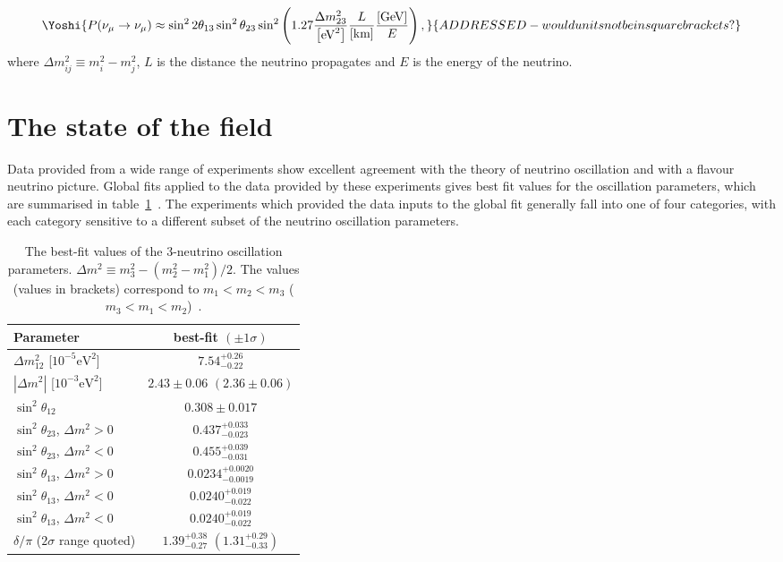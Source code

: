 \begin{equation}
  \Yoshi{P(\nu_\mu \rightarrow \nu_\mu) \approx \sin^{2}2\theta_{13}\sin^{2}\theta_{23}\sin^2\left(1.27\frac{\Delta m^{2}_{23}}{\left[\textrm{eV}^2\right]}\frac{L}{\left[\textrm{km}\right]}\frac{\left[\textrm{GeV}\right]}{E}\right),}{ADDRESSED - would units not be in square brackets?}
  \label{eq:ElectronNeutrinoAppearanceProbability}
\end{equation}
where $\Delta m^{2}_{ij} \equiv m^{2}_{i} - m^{2}_{j}$, $L$ is the distance the neutrino propagates and $E$ is the energy of the neutrino.

\section{The state of the field}
\label{sec:StateOfTheField}
Data provided from a wide range of experiments show excellent agreement with the theory of neutrino oscillation and with a flavour neutrino picture.  Global fits applied to the data provided by these experiments gives best fit values for the oscillation parameters, which are summarised in table~\ref{table:NeutrinoOscillationParameterValues}~\cite{Agashe:2014kda}.  The experiments which provided the data inputs to the global fit generally fall into one of four categories, with each category sensitive to a different subset of the neutrino oscillation parameters.
\begin{table}
  \begin{tabular}{l c }
    Parameter & best-fit $(\pm1\sigma)$ \\ \hline \hline
    $\Delta m^2_{12}$ [$10^{-5}\textrm{eV}^2$] & $7.54^{+0.26}_{-0.22}$ \\
    $|\Delta m^2|$ [$10^{-3}\textrm{eV}^2$] & $2.43\pm0.06$ $(2.36\pm0.06)$ \\
    $\sin^2\theta_{12}$ & $0.308\pm0.017$ \\
    $\sin^2\theta_{23}$, $\Delta m^2 > 0$ & $0.437^{+0.033}_{-0.023}$ \\
    $\sin^2\theta_{23}$, $\Delta m^2 < 0$ & $0.455^{+0.039}_{-0.031}$ \\
    $\sin^2\theta_{13}$, $\Delta m^2 > 0$ & $0.0234^{+0.0020}_{-0.0019}$ \\
    $\sin^2\theta_{13}$, $\Delta m^2 < 0$ & $0.0240^{+0.019}_{-0.022}$ \\
    $\sin^2\theta_{13}$, $\Delta m^2 < 0$ & $0.0240^{+0.019}_{-0.022}$ \\
    $\delta/\pi$ ($2\sigma$ range quoted) & $1.39^{+0.38}_{-0.27}$ $(1.31^{+0.29}_{-0.33})$ \\
  \end{tabular}
  \caption{The best-fit values of the 3-neutrino oscillation parameters. $\Delta m^2 \equiv m^2_3 - \left(m^2_2 - m^2_1\right)/2$. The values (values in brackets) correspond to $m_1 < m_2 < m_3$ ($m_3 < m_1 < m_2$)~\cite{Agashe:2014kda}.}
  \label{table:NeutrinoOscillationParameterValues}
\end{table}
